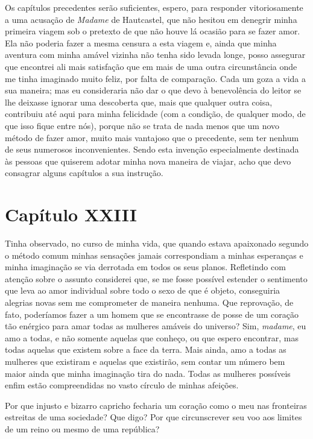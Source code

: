  Os capítulos precedentes serão suficientes, espero, para responder
vitoriosamente a uma acusação de \textit{Madame} de Hautcastel, que não
hesitou em denegrir minha primeira viagem sob o pretexto de que não
houve lá ocasião para se fazer amor. Ela não poderia fazer a mesma
censura a esta viagem e, ainda que minha aventura com minha amável
vizinha não tenha sido levada longe, posso assegurar que encontrei ali
mais satisfação que em mais de uma outra circunstância onde me tinha
imaginado muito feliz, por falta de comparação. Cada um goza a vida a
sua maneira; mas eu consideraria não dar o que devo à benevolência do
leitor se lhe deixasse ignorar uma descoberta que, mais que qualquer
outra coisa, contribuiu até aqui para minha felicidade (com a condição,
de qualquer modo, de que isso fique entre nós), porque não se trata de
nada menos que um novo método de fazer amor, muito mais vantajoso que o
precedente, sem ter nenhum de seus numerosos inconvenientes. Sendo esta
invenção especialmente destinada às pessoas que quiserem adotar minha
nova maneira de viajar, acho que devo consagrar alguns capítulos a sua
instrução. 

\section*{Capítulo XXIII}

 Tinha observado, no curso de minha vida, que quando estava apaixonado
segundo o método comum minhas sensações jamais correspondiam a minhas
esperanças e minha imaginação se via derrotada em todos os seus planos.
Refletindo com atenção sobre o assunto considerei que, se me fosse
possível estender o sentimento que leva ao amor individual sobre todo o
sexo de que é objeto, conseguiria alegrias novas sem me comprometer de
maneira nenhuma. Que reprovação, de fato, poderíamos fazer a um homem
que se encontrasse de posse de um coração tão enérgico para amar todas
as mulheres amáveis do universo? Sim, \textit{madame}, eu amo a todas,
e não somente aquelas que conheço, ou que espero encontrar, mas todas
aquelas que existem sobre a face da terra. Mais ainda, amo a todas as
mulheres que existiram e aquelas que existirão, sem contar um número
bem maior ainda que minha imaginação tira do nada. Todas as mulheres
possíveis enfim estão compreendidas no vasto círculo de minhas
afeições.

 Por que injusto e bizarro capricho fecharia um coração como o meu nas
fronteiras estreitas de uma sociedade? Que digo? Por que circunscrever
seu voo aos limites de um reino ou mesmo de uma república? 

